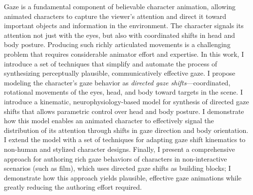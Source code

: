 Gaze is a fundamental component of believable character animation, allowing animated characters to capture the viewer's attention and direct it toward important objects and information in the environment. The character signals its attention not just with the eyes, but also with coordinated shifts in head and body posture. Producing such richly articulated movements is a challenging problem that requires considerable animator effort and expertise. In this work, I introduce a set of techniques that simplify and automate the process of synthesizing perceptually plausible, communicatively effective gaze. I propose modeling the character's gaze behavior as \emph{directed gaze shifts}---coordinated, rotational movements of the eyes, head, and body toward targets in the scene. I introduce a kinematic, neurophysiology-based model for synthesis of directed gaze shifts that allows parametric control over head and body posture. I demonstrate how this model enables an animated character to effectively signal the distribution of its attention through shifts in gaze direction and body orientation. I extend the model with a set of techniques for adapting gaze shift kinematics to non-human and stylized character designs. Finally, I present a comprehensive approach for authoring rich gaze behaviors of characters in non-interactive scenarios (such as film), which uses directed gaze shifts as building blocks; I demonstrate how this approach yields plausible, effective gaze animations while greatly reducing the authoring effort required.
